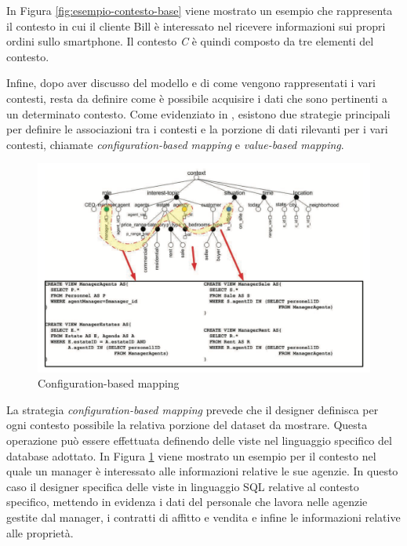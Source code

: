 In Figura \ref{fig:esempio-contesto-base} viene mostrato un esempio che rappresenta il contesto in cui il cliente Bill è interessato nel ricevere informazioni sui propri ordini sullo smartphone. Il contesto \emph{C} è quindi composto da tre elementi del contesto.

Infine, dopo aver discusso del modello e di come vengono rappresentati i vari contesti, resta da definire come è possibile acquisire i dati che sono pertinenti a un determinato contesto. Come evidenziato in \cite{DBLP:journals/cacm/BolchiniCOQRST09}, esistono due strategie principali per definire le associazioni tra i contesti e la porzione di dati rilevanti per i vari contesti, chiamate \emph{configuration-based mapping} e \emph{value-based mapping}.

\begin{figure}[ht]
	\centering
	\includegraphics[width=\textwidth]{2-nozioni-preliminari/Immagini/configuration-based-mapping.png}
	\caption{Configuration-based mapping}\label{fig:configuration-based-mapping}
\end{figure}

La strategia \emph{configuration-based mapping} prevede che il designer definisca per ogni contesto possibile la relativa porzione del dataset da mostrare. Questa operazione può essere effettuata definendo delle viste nel linguaggio specifico del database adottato. In Figura \ref{fig:configuration-based-mapping} viene mostrato un esempio per il contesto nel quale un manager è interessato alle informazioni relative le sue agenzie. In questo caso il designer specifica delle viste in linguaggio SQL relative al contesto specifico, mettendo in evidenza i dati del personale che lavora nelle agenzie gestite dal manager, i contratti di affitto e vendita e infine le informazioni relative alle proprietà.

